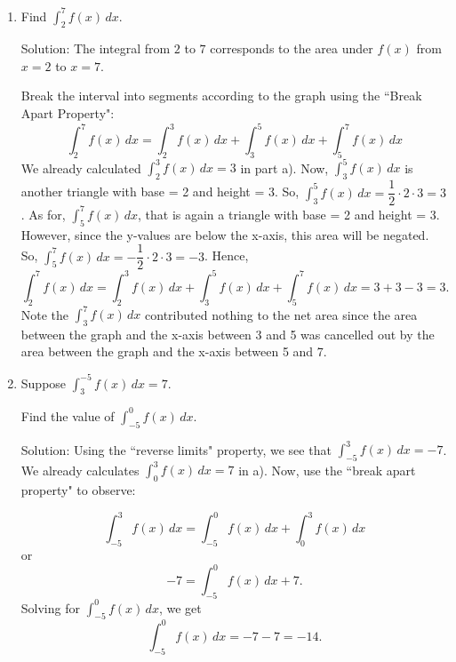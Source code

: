 \documentclass[11pt]{article}
\begin{document}
\begin{enumerate}
\begin{enumerate}
{    Break the interval into segments according to the graph using the ``break apart" property:
\[\int_0^3 f(x)\,dx = \int_0^2 f(x)\,dx + \int_2^3 f(x)\,dx\]
    \[
    \int_0^2 f(x)\,dx = \text{area of triangle with base 2, height 2} = \frac{1}{2}\cdot 2 \cdot 2 = 2\] 
\[\int_0^2 f(x)\,dx = 2 + 2 = 4\]
    \[
    \int_2^3 f(x)\,dx = \text{area of rectangle with width 1 and height 3} = 1\cdot 3 = 3.
    \]
Hence, 
  \[\int_0^3 f(x)\,dx = \int_0^2 f(x)\,dx + \int_2^3 f(x)\,dx = 4 + 3 = 7\]  
    }
    \item Find $\displaystyle\int_2^7 f(x)\,dx$.\\
 {\color{blue}%
    Solution: The integral from $2$ to $7$ corresponds to the area under $f(x)$ from $x=2$ to $x=7$. 

    Break the interval into segments according to the graph using the ``Break Apart Property":
\[\int_2^7 f(x)\,dx = \int_2^3 f(x)\,dx + \int_3^5 f(x)\,dx + \int_5^7 f(x)\,dx\]
We already calculated $\int_2^3 f(x)\,dx = 3$ in part a). Now, $\int_3^5 f(x)\,dx$ is another triangle with base = 2 and height = 3. So, $\int_3^5 f(x)\,dx  = \dfrac{1}{2} \cdot 2 \cdot 3 = 3$. As for, $\int_5^7 f(x)\,dx$, that is again a triangle with base = 2 and height = 3. However, since the y-values are below the x-axis, this area will be negated. So, $\int_5^7 f(x)\,dx =  -\dfrac{1}{2} \cdot 2 \cdot 3 = -3$. Hence, 
\[\int_2^7 f(x)\,dx = \int_2^3 f(x)\,dx + \int_3^5 f(x)\,dx + \int_5^7 f(x)\,dx = 3 + 3 - 3 = 3.\]
Note the $\int_3^7 f(x)\,dx$ contributed nothing to the net area since the area between the graph and the x-axis between 3 and 5 was cancelled out by the area between the graph and the x-axis between 5 and 7.
    }
    \item Suppose $\displaystyle\int_{3}^{-5} f(x)\,dx=7$. 
    
    Find the value of $\displaystyle\int_{-5}^{0} f(x)\,dx$.\\
{\color{blue}%
Solution: Using the ``reverse limits" property, we see that
$\displaystyle\int_{-5}^{3} f(x)\,dx=-7$. We already calculates $\displaystyle\int_{0}^{3} f(x)\,dx=7$ in a). Now, use the ``break apart property" to observe:

\[
    \displaystyle\int_{-5}^{3} f(x)\,dx = \displaystyle\int_{-5}^{0} f(x)\,dx + \displaystyle\int_{0}^{3} f(x)\,dx \]
    or
    \[-7 = \displaystyle\int_{-5}^{0} f(x)\,dx + 7.\] Solving for $\displaystyle\int_{-5}^{0} f(x)\,dx$, we get 
    \[\displaystyle\int_{-5}^{0} f(x)\,dx = -7 -7 = -14.\]
}
    \vfill
\end{enumerate}


\end{enumerate}
\end{document}
